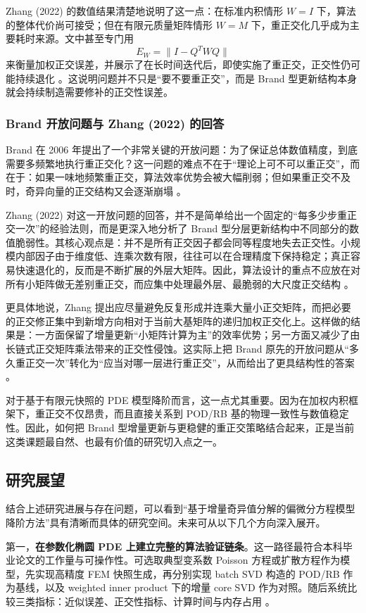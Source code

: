 Zhang (2022) 的数值结果清楚地说明了这一点：在标准内积情形 $W=I$ 下，算法的整体代价尚可接受；但在有限元质量矩阵情形 $W=M$ 下，重正交化几乎成为主要耗时来源。文中甚至专门用
\[
E_W=\|I-Q^TWQ\|
\]
来衡量加权正交误差，并展示了在长时间迭代后，即使实施了重正交，正交性仍可能持续退化 \cite{zhang2022}。这说明问题并不只是“要不要重正交”，而是 Brand 型更新结构本身就会持续制造需要修补的正交性误差。

\subsubsection{Brand 开放问题与 Zhang (2022) 的回答}

Brand 在 2006 年提出了一个非常关键的开放问题：为了保证总体数值精度，到底需要多频繁地执行重正交化？这一问题的难点不在于“理论上可不可以重正交”，而在于：如果一味地频繁重正交，算法效率优势会被大幅削弱；但如果重正交不及时，奇异向量的正交结构又会逐渐崩塌 \cite{brand2006}。

Zhang (2022) 对这一开放问题的回答，并不是简单给出一个固定的“每多少步重正交一次”的经验法则，而是更深入地分析了 Brand 型分层更新结构中不同部分的数值脆弱性。其核心观点是：并不是所有正交因子都会同等程度地失去正交性。小规模内部因子由于维度低、连乘次数有限，往往可以在合理精度下保持稳定；真正容易快速退化的，反而是不断扩展的外层大矩阵。因此，算法设计的重点不应放在对所有小矩阵做无差别重正交，而应集中处理最外层、最脆弱的大尺度正交结构 \cite{zhang2022}。

更具体地说，Zhang 提出应尽量避免反复形成并连乘大量小正交矩阵，而把必要的正交修正集中到新增方向相对于当前大基矩阵的递归加权正交化上。这样做的结果是：一方面保留了增量更新“小矩阵计算为主”的效率优势；另一方面又减少了由长链式正交矩阵乘法带来的正交性侵蚀。这实际上把 Brand 原先的开放问题从“多久重正交一次”转化为“应当对哪一层进行重正交”，从而给出了更具结构性的答案 \cite{zhang2022}。

对于基于有限元快照的 PDE 模型降阶而言，这一点尤其重要。因为在加权内积框架下，重正交不仅昂贵，而且直接关系到 POD/RB 基的物理一致性与数值稳定性。因此，如何把 Brand 型增量更新与更稳健的重正交策略结合起来，正是当前这类课题最自然、也最有价值的研究切入点之一。

\subsection{研究展望}

结合上述研究进展与存在问题，可以看到“基于增量奇异值分解的偏微分方程模型降阶方法”具有清晰而具体的研究空间。未来可从以下几个方向深入展开。

第一，\textbf{在参数化椭圆 PDE 上建立完整的算法验证链条}。这一路径最符合本科毕业论文的工作量与可操作性。可选取典型变系数 Poisson 方程或扩散方程作为模型，先实现高精度 FEM 快照生成，再分别实现 batch SVD 构造的 POD/RB 作为基线，以及 weighted inner product 下的增量 core SVD 作为对照。随后系统比较三类指标：近似误差、正交性指标、计算时间与内存占用 \cite{hesthaven2015,fareed2018,zhang2022}。

